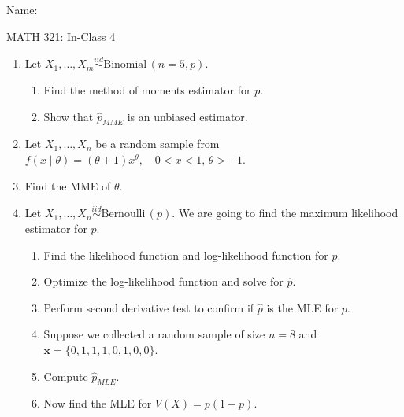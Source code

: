 \documentclass{article}
\newcommand{\vecn}[2]{#1_1, \ldots, #1_{#2}}	%
\newcommand{\followsp}[2]{\overset{#1}\sim \text{#2}\,}		%
\begin{document}
\hspace{375pt}Name:

\begin{center}
{\Huge MATH 321: In-Class 4}
\end{center}

\bigskip\bigskip



\begin{enumerate}

    \item Let $\vecn{X}{m} \followsp{iid}{Binomial}(n = 5, p)$.
    \begin{enumerate}%
        \item Find the method of moments estimator for $p$.\vspace{60pt}
        \item Show that $\hat{p}_{MME}$ is an unbiased estimator.\vspace{50pt}
    \end{enumerate}
    
    \item Let $\vecn{X}{n}$ be a random sample from $f(x \mid \theta) = (\theta + 1) x ^{\theta}, \quad 0 < x < 1, \, \theta > -1$.%
    \item[] Find the MME of $\theta$.\vspace{120pt}
    
    \item Let $\vecn{X}{n} \followsp{iid}{Bernoulli}(p)$. We are going to find the maximum likelihood estimator for $p$.%
    \begin{enumerate}
        \item Find the likelihood function and log-likelihood function for $p$.\vspace{80pt}
        \item Optimize the log-likelihood function and solve for $\hat{p}$.\vspace{140pt}
        \item Perform second derivative test to confirm if $\hat{p}$ is the MLE for $p$.\vspace{150pt}
        \item Suppose we collected a random sample of size $n = 8$ and $\mathbf{x} = \{0, 1, 1, 1, 0, 1, 0, 0\}$.%
        \item[] Compute $\hat{p}_{MLE}$.\vspace{40pt}
        \item Now find the MLE for $V(X) = p (1 - p)$.\vspace{50pt}%
    \end{enumerate}
        
\end{enumerate}
\end{document}
